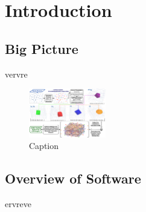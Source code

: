 \chapter{Introduction} \label{sec:Introduction}

\section{Big Picture}
vervre

\begin{figure}[h]
    \centering
    \includegraphics[width=0.3\textwidth]{pysipfenn/KS2022.png}
    \caption{Caption}
    \label{fig:graphicalabstract}
\end{figure}

\cite{Krajewski2024Nimplex}

\section{Overview of Software}

ervreve

\printbibliography[heading=subbibintoc]
